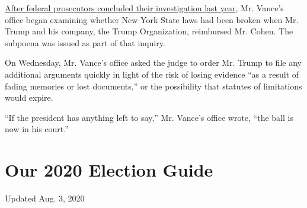 \href{https://www.nytimes3xbfgragh.onion/2019/07/17/nyregion/michael-cohen-trump-investigation.html}{After
federal prosecutors concluded their investigation last year}, Mr.
Vance's office began examining whether New York State laws had been
broken when Mr. Trump and his company, the Trump Organization,
reimbursed Mr. Cohen. The subpoena was issued as part of that inquiry.

On Wednesday, Mr. Vance's office asked the judge to order Mr. Trump to
file any additional arguments quickly in light of the risk of losing
evidence ``as a result of fading memories or lost documents,'' or the
possibility that statutes of limitations would expire.

``If the president has anything left to say,'' Mr. Vance's office wrote,
``the ball is now in his court.''

\hypertarget{our-2020-election-guide}{%
\section{Our 2020 Election Guide}\label{our-2020-election-guide}}

Updated Aug. 3, 2020

